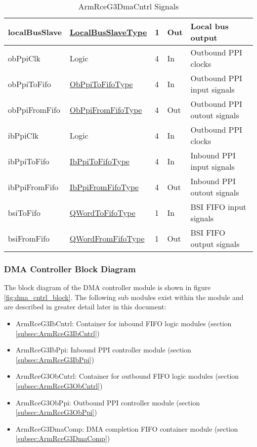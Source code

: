 \documentclass[11pt]{article}
\begin{document}
\begin{table}[H]
\begin{tabular}{| l | l | l | l | l | }
      \hline localBusSlave     & \hyperref[subsec:LocalBusSlaveType]{LocalBusSlaveType}       & 1  & Out      & Local bus output          \\
      \hline obPpiClk          & Logic                                                        & 4  & In       & Outbound PPI clocks  \\
      \hline obPpiToFifo       & \hyperref[subsec:ObPpiToFifoType]{ObPpiToFifoType}         & 4  & In       & Outbound PPI input signals \\
      \hline obPpiFromFifo     & \hyperref[subsec:ObPpiFromFifoType]{ObPpiFromFifoType}     & 4  & Out      & Outbound PPI outout signals \\
      \hline ibPpiClk          & Logic                                                        & 4  & In       & Outbound PPI clocks  \\
      \hline ibPpiToFifo       & \hyperref[subsec:IbPpiToFifoType]{IbPpiToFifoType}         & 4  & In       & Inbound PPI input signals \\
      \hline ibPpiFromFifo     & \hyperref[subsec:IbPpiFromFifoType]{IbPpiFromFifoType}     & 4  & Out      & Inbound PPI outout signals \\
      \hline bsiToFifo         & \hyperref[subsec:QWordToFifoType]{QWordToFifoType}           & 1  & In       & BSI FIFO input signals  \\
      \hline bsiFromFifo       & \hyperref[subsec:QWordFromFifoType]{QWordFromFifoType}       & 1  & Out      & BSI FIFO output signals \\
      \hline
   \end{tabular}
   \caption{ArmRceG3DmaCntrl Signals}
   \label{tab:dma_cntrl_signals}
\end{table}

\subsubsection{DMA Controller Block Diagram}

The block diagram of the DMA controller module is shown in figure \ref{fig:dma_cntrl_block}. The following sub modules
exist within the module and are described in greater detail later in this document:

\begin{itemize}
   \item ArmRceG3IbCntrl: Container for inbound FIFO logic modules (section \ref{subsec:ArmRceG3IbCntrl})
   \item ArmRceG3IbPpi: Inbound PPI controller module (section \ref{subsec:ArmRceG3IbPpi})
   \item ArmRceG3ObCntrl: Container for outbound FIFO logic modules (section \ref{subsec:ArmRceG3ObCntrl})
   \item ArmRceG3ObPpi: Outbound PPI controller module (section \ref{subsec:ArmRceG3ObPpi})
   \item ArmRceG3DmaComp: DMA completion FIFO container module (section \ref{subsec:ArmRceG3DmaComp})
\end{itemize}
\end{document}
